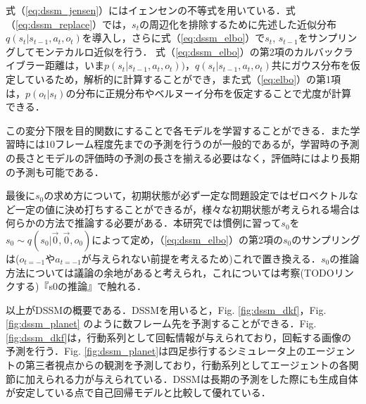 式（\ref{eq:dssm_jensen}）にはイェンセンの不等式を用いている．式（\ref{eq:dssm_replace}）では，$s_t$の周辺化を排除するために先述した近似分布$q(s_t|s_{t-1}, a_t, o_t)$を導入し，さらに式（\ref{eq:dssm_elbo}）で$s_t$, $s_{t-1}$をサンプリングしてモンテカルロ近似を行う．
式（\ref{eq:dssm_elbo}）の第2項のカルバックライブラー距離は，いま$p(s_t|s_{t-1}, a_t, o_t))$，$q(s_t|s_{t-1}, a_t, o_t)$共にガウス分布を仮定しているため，解析的に計算することができ，また式（\ref{eq:elbo}）の第1項は，$p(o_t|s_t)$の分布に正規分布やベルヌーイ分布を仮定することで尤度が計算できる．

この変分下限を目的関数にすることで各モデルを学習することができる．また学習時には10フレーム程度先までの予測を行うのが一般的であるが，学習時の予測の長さとモデルの評価時の予測の長さを揃える必要はなく，評価時にはより長期の予測も可能である．

最後に$s_0$の求め方について，初期状態が必ず一定な問題設定ではゼロベクトルなど一定の値に決め打ちすることができるが，様々な初期状態が考えられる場合は何らかの方法で推論する必要がある．本研究では慣例に習って$s_0$を$s_0 \sim q(s_0|\vec{0}, \vec{0}, o_0) $によって定め，（\ref{eq:dssm_elbo}）の第2項の$s_0$のサンプリングは($o_{t=-1}$や$a_{t=-1}$が与えられない前提を考えるため)これで置き換える．$s_0$の推論方法については議論の余地があると考えられ，これについては考察(TODOリンクする)『s0の推論』で触れる．

\vspace{\baselineskip}
以上がDSSMの概要である．DSSMを用いると，Fig. \ref{fig:dssm_dkf}，Fig. \ref{fig:dssm_planet} のように数フレーム先を予測することができる．Fig. \ref{fig:dssm_dkf}は，行動系列として回転情報が与えられており，回転する画像の予測を行う．Fig. \ref{fig:dssm_planet}は四足歩行するシミュレータ上のエージェントの第三者視点からの観測を予測しており，行動系列としてエージェントの各関節に加えられる力が与えられている．DSSMは長期の予測をした際にも生成自体が安定している点で自己回帰モデルと比較して優れている．

